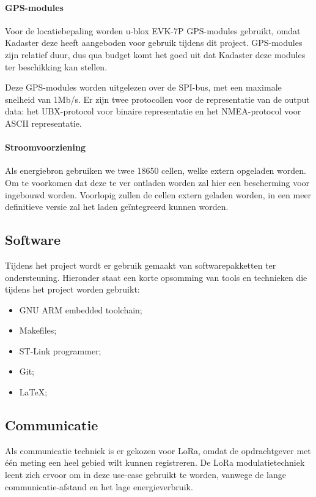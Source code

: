 \paragraph{GPS-modules}
Voor de locatiebepaling worden u-blox EVK-7P GPS-modules gebruikt, omdat Kadaster deze heeft aangeboden voor gebruik tijdens dit project. GPS-modules zijn relatief duur, dus qua budget komt het goed uit dat Kadaster deze modules ter beschikking kan stellen.

Deze GPS-modules worden uitgelezen over de SPI-bus, met een maximale snelheid van 1Mb/s. Er zijn twee protocollen voor de representatie van de output data: het UBX-protocol voor binaire representatie en het NMEA-protocol voor ASCII representatie.

\paragraph{Stroomvoorziening}
Als energiebron gebruiken we twee 18650 cellen, welke extern opgeladen worden.
Om te voorkomen dat deze te ver ontladen worden zal hier een bescherming voor
ingebouwd worden. Voorlopig zullen de cellen extern geladen worden, in een meer
definitieve versie zal het laden geïntegreerd kunnen worden.

\subsection{Software}
Tijdens het project wordt er gebruik gemaakt van softwarepakketten ter ondersteuning. Hieronder staat een korte opsomming van tools en technieken die tijdens het project worden gebruikt:
\begin{itemize}
    \item GNU ARM embedded toolchain;
    \item Makefiles;
    \item ST-Link programmer;
    \item Git;
    \item \LaTeX;
\end{itemize}

\subsection{Communicatie}
Als communicatie techniek is er gekozen voor LoRa, omdat de opdrachtgever met één meting een heel gebied wilt kunnen registreren. De LoRa modulatietechniek leent zich ervoor om in deze use-case gebruikt te worden, vanwege de lange communicatie-afstand en het lage energieverbruik.

